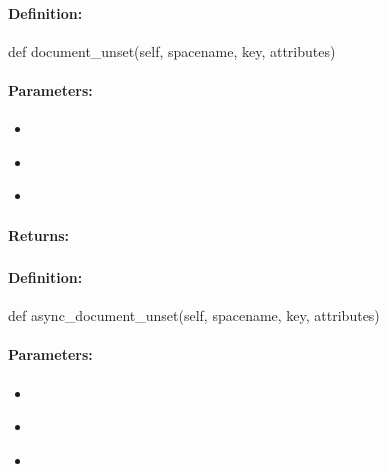 \paragraph{Definition:}
\begin{pythoncode}
def document_unset(self, spacename, key, attributes)
\end{pythoncode}

\paragraph{Parameters:}
\begin{itemize}[noitemsep]
\item {}\\

\item {}\\

\item {}\\

\end{itemize}

\paragraph{Returns:}


\pagebreak
\subsubsection{}
\label{api:python:async_document_unset}


\paragraph{Definition:}
\begin{pythoncode}
def async_document_unset(self, spacename, key, attributes)
\end{pythoncode}

\paragraph{Parameters:}
\begin{itemize}[noitemsep]
\item {}\\

\item {}\\

\item {}\\

\end{itemize}

